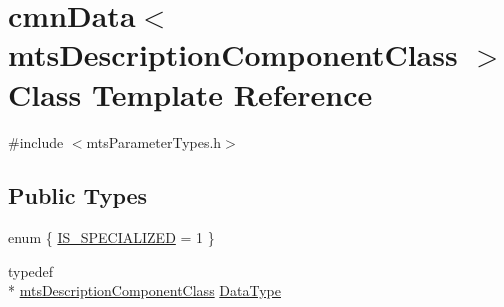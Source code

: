 \hypertarget{classcmn_data_3_01mts_description_component_class_01_4}{\section{cmn\-Data$<$ mts\-Description\-Component\-Class $>$ Class Template Reference}
\label{classcmn_data_3_01mts_description_component_class_01_4}
}


{\ttfamily \#include $<$mts\-Parameter\-Types.\-h$>$}

\subsection*{Public Types}
\begin{DoxyCompactItemize}
\item 
enum \{ \hyperlink{classcmn_data_3_01mts_description_component_class_01_4_a43b89b10cd1b3fd4a48c60337710c151a8369bc34b27ba5ebdd2edf6943e2cceb}{I\-S\-\_\-\-S\-P\-E\-C\-I\-A\-L\-I\-Z\-E\-D} = 1
 \}
\item 
typedef \\*
\hyperlink{classmts_description_component_class}{mts\-Description\-Component\-Class} \hyperlink{classcmn_data_3_01mts_description_component_class_01_4_a63c14a01f80b214ab860f6a0e04afa31}{Data\-Type}
\end{DoxyCompactItemize}

